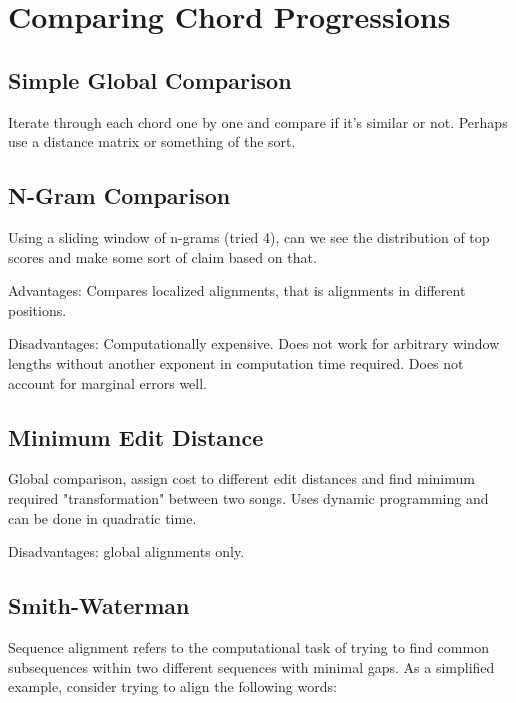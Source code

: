 \section{Comparing Chord Progressions}

\subsection{Simple Global Comparison}

\item Iterate through each chord one by one and compare if it's similar or not. Perhaps use a distance matrix or something of the sort.

\subsection{N-Gram Comparison}

\item Using a sliding window of n-grams (tried 4), can we see the distribution of top scores and make some sort of claim based on that.

\item Advantages: Compares localized alignments, that is alignments in different positions.

\item Disadvantages: Computationally expensive. Does not work for arbitrary window lengths without another exponent in computation time required. Does not account for marginal errors well.

\subsection{Minimum Edit Distance}

\item Global comparison, assign cost to different edit distances and find minimum required "transformation" between two songs. Uses dynamic programming and can be done in quadratic time.

\item Disadvantages: global alignments only.

\subsection{Smith-Waterman}

Sequence alignment refers to the computational task of trying to find common subsequences within two different sequences with minimal gaps. As a simplified example, consider trying to align the following words:

